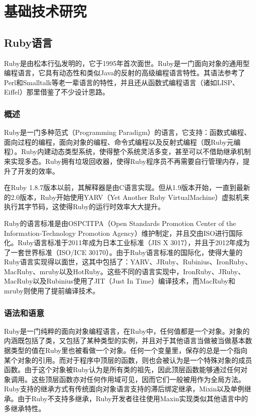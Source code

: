 \chapter{基础技术研究}
\section{Ruby语言}
Ruby是由松本行弘发明的，它于1995年首次面世。Ruby是一门面向对象的通用型编程语言，它具有动态性和类似Java的反射的高级编程语言特性。其语法参考了Perl和Smalltalk等老一辈语言的特性，并且还从函数式编程语言（诸如LISP、Eiffel）那里借鉴了不少设计思路\supercite{ruby-inspire}。

\subsection{概述}
Ruby是一门多种范式（Programming Paradigm）的语言，它支持：函数式编程、面向过程的编程，面向对象的编程、命令式编程以及反射式编程（既Ruby元编程）。Ruby内建动态类型系统，使得整个系统灵活多变，甚至可以不借助继承机制来实现多态。Ruby拥有垃圾回收器，使得Ruby程序员不再需要自行管理内存，提升了开发的效率。

在Ruby 1.8.7版本以前，其解释器是由C语言实现。但从1.9版本开始，一直到最新的2.0版本，Ruby开始使用YARV（Yet Another Ruby VirtualMachine）虚拟机来执行其字节码，这使得Ruby的运行时效率大大提升。

Ruby的语言标准是由OSPCITPA（Open Standards Promotion Center of the Information-Technology Promotion Agency）维护制定，并且交由ISO进行国际化。Ruby语言标准于2011年成为日本工业标准（JIS X 3017）\supercite{ruby-jp-standard}，并且于2012年成为了一套世界标准（ISO/ICE 30170）\supercite{ruby-inter-standard}。由于Ruby语言标准的国际化，使得大量的Ruby语言实现得以面世，这其中包括了：YARV、JRuby、Rubinius、IronRuby、MacRuby、mruby以及HotRuby。这些不同的语言实现中，IronRuby、JRuby、MacRuby以及Rubinius使用了JIT（Just In Time）编译技术，而MacRuby和mruby则使用了提前编译技术。

\subsection{语法和语意}
Ruby是一门纯粹的面向对象编程语言，在Ruby中，任何值都是一个对象。对象的内涵既包括了类，又包括了某种类型的实例，并且对于其他语言当做被当做基本数据类型的值在Ruby里也被看做一个对象。任何一个变量里，保存的总是一个指向某个对象的引用。而对于程序中顶层的函数，则也会被认为是一个特殊对象的成员函数。由于这个对象被Ruby认为是所有类的祖先，因此顶层函数能够通过任何对象调用。这些顶层函数亦对任何作用域可见，因而它们一般被用作为全局方法。Ruby支持的继承方式有传统面向对象语言支持的滞后绑定继承，Mixin以及单例继承。由于Ruby不支持多继承，Ruby开发者往往使用Maxin实现类似其他语言中的多继承特性。


